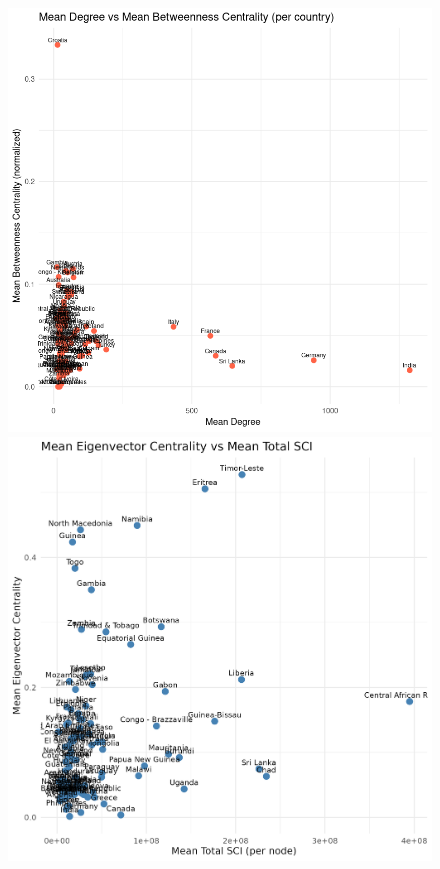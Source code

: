 \begin{figure}[htbp]
    \centering
    \begin{minipage}[t]{0.48\linewidth}
        \centering
        \includegraphics[width=\linewidth]{images/image.png}
        \caption{}
        \label{fig:im}
    \end{minipage}
    \hfill
    \begin{minipage}[t]{0.48\linewidth}
        \centering
        \includegraphics[width=\linewidth]{images/eig.png}
        \caption{}
        \label{fig:eig}
    \end{minipage}
    \label{fig:schelling1D}
\end{figure}


\newpage